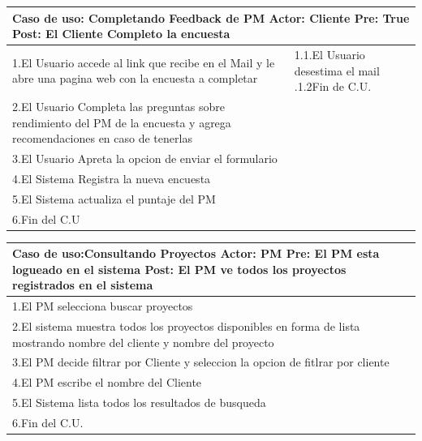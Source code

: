 \begin{longtable}{|p{}|p{}|}
    \hline
    \multicolumn{2}{|p{16cm}|}{
        \textbf{Caso de uso:} Completando Feedback de PM\newline
        \textbf{Actor:} Cliente\newline
        \textbf{Pre: }True\newline
        \textbf{Post: }El Cliente Completo la encuesta
    }\\
    \hline
    1.El Usuario accede al link que recibe en el Mail y le abre una pagina web con la encuesta a completar & 1.1.El Usuario desestima el mail .\newline 1.2Fin de C.U.\\
    \hline
    2.El Usuario Completa las preguntas sobre rendimiento del PM de la encuesta y agrega recomendaciones en caso de tenerlas&    \\
    \hline
    3.El Usuario Apreta la opcion de enviar el formulario& \\
    \hline
    4.El Sistema Registra la nueva encuesta&\\
    \hline
    5.El Sistema actualiza el puntaje del PM&\\
    \hline
    6.Fin del C.U&\\
    \hline
\end{longtable}

\begin{longtable}{|p{}|p{}|}
    \hline
    \multicolumn{2}{|p{16cm}|}{
        \textbf{Caso de uso:}Consultando Proyectos\newline
        \textbf{Actor:} PM\newline
        \textbf{Pre: }El PM esta logueado en el sistema\newline
        \textbf{Post:} El PM ve todos los proyectos registrados en el sistema
    }\\
    \hline
    1.El PM selecciona buscar proyectos& \\
    \hline
    2.El sistema muestra todos los proyectos disponibles en forma de lista mostrando nombre del cliente y nombre del proyecto &\\
    \hline
    3.El PM decide filtrar por Cliente y seleccion la opcion de fitlrar por cliente& \\
    \hline
    4.El PM escribe el nombre del Cliente& \\
    \hline
    5.El Sistema lista todos los resultados de busqueda&\\
    \hline
    6.Fin del C.U.&\\
    \hline
\end{longtable}

